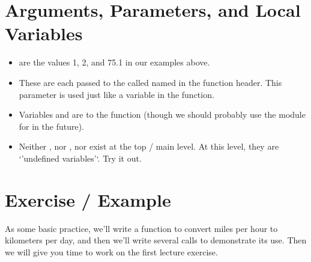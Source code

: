 \documentclass[letterpaper,10pt,english]{sphinxmanual}
\begin{document}
\section{Arguments, Parameters, and Local Variables}
\label{\detokenize{lecture_notes/lec05_functions2:arguments-parameters-and-local-variables}}\begin{itemize}
\item {} 
 are the values 1, 2, and 75.1 in our examples above.

\item {} 
These are each passed to the  called  named in
the function header. This parameter is used just like a variable in
the function.

\item {} 
Variables  and  are  to the
function (though we should probably use the  module for 
in the future).

\item {} 
Neither , nor , nor  exist at the top / main
level. At this level, they are ‘’undefined variables’‘. Try it out.

\end{itemize}


\section{Exercise / Example}
\label{\detokenize{lecture_notes/lec05_functions2:exercise-example}}
As some basic practice, we’ll write a function to convert miles per
hour to kilometers per day, and then we’ll write several calls to
demonstrate its use.  Then we will give you time to work on the first
lecture exercise.
\end{document}
